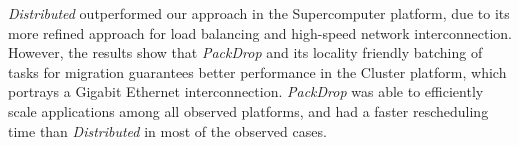 \textit{Distributed} outperformed our approach in the Supercomputer platform, due to its more refined approach for load balancing and high-speed network interconnection.
However, the results show that \textit{PackDrop} and its locality friendly batching of tasks for migration guarantees better performance in the Cluster platform, which portrays a Gigabit Ethernet interconnection.
\textit{PackDrop} was able to efficiently scale applications among all observed platforms, and had a faster rescheduling time than \textit{Distributed} in most of the observed cases.
